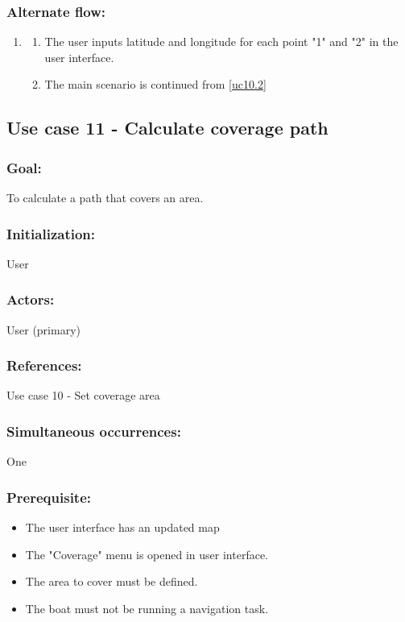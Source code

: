 \begin{framed}
	\subsubsection*{Alternate flow:}
	\begin{enumerate}
		\item 
		\begin{enumerate}
			\item The user inputs latitude and longitude for each point "1" and "2" in the user interface.
			\item The main scenario is continued from \ref{uc10.2}
		\end{enumerate}
	\end{enumerate}
\end{framed}	

\begin{framed}
	\subsection{Use case 11 - Calculate coverage path}
	\subsubsection*{Goal:}
	To calculate a path that covers an area.
	
	\subsubsection*{Initialization:}
	User
	
	\subsubsection*{Actors:}
	User (primary)
	
	\subsubsection*{References:}
	Use case 10 - Set coverage area
	
	\subsubsection*{Simultaneous occurrences:}
	One 
	
	\subsubsection*{Prerequisite:}
	\begin{itemize}
		\item The user interface has an updated map
		\item The "Coverage" menu is opened in user interface.
		\item The area to cover must be defined.
		\item The boat must not be running a navigation task.
	\end{itemize}
	

\end{framed}
